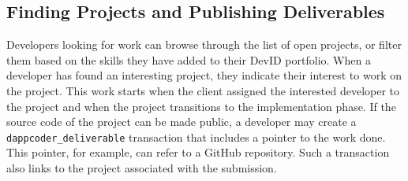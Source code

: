 \subsection{Finding Projects and Publishing Deliverables}
\label{subsec:create_submissions}
Developers looking for work can browse through the list of open projects, or filter them based on the skills they have added to their DevID portfolio.
When a developer has found an interesting project, they indicate their interest to work on the project.
This work starts when the client assigned the interested developer to the project and when the project transitions to the implementation phase.
If the source code of the project can be made public, a developer may create a \texttt{dappcoder\_deliverable} transaction that includes a pointer to the work done.
This pointer, for example, can refer to a GitHub repository.
Such a transaction also links to the project associated with the submission.





